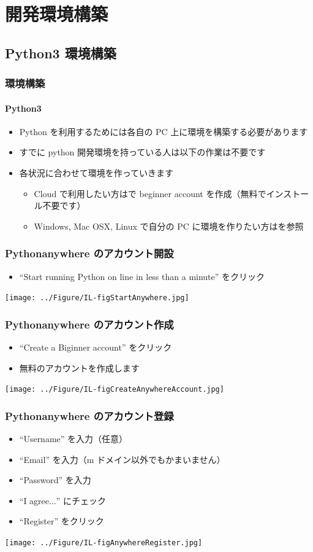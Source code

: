 \section{開発環境構築}
\subsection{Python3 環境構築}
\begin{frame}[shrink]
\frametitle{環境構築}
\framesubtitle{Python3}
  \begin{itemize}
\item Python を利用するためには各自の PC 上に環境を構築する必要があります
\item すでに python 開発環境を持っている人は以下の作業は不要です
\item 各状況に合わせて環境を作っていきます
    \begin{itemize}
\item Cloud で利用したい方は\href{https://www.pythonanywhere.com/}{}で beginner account を作成（無料でインストール不要です）
\item Windows, Mac OSX, Linux で自分の PC に環境を作りたい方は\href{https://www.python.jp/install/install.html}{}を参照
    \end{itemize}
  \end{itemize}
\end{frame}
\begin{frame}
\frametitle{Pythonanywhere のアカウント開設}
  \begin{itemize}
\item ``Start running Python on line in less than a minute'' をクリック
  \end{itemize}
\texttt{[image: ../Figure/IL-figStartAnywhere.jpg]}
\end{frame}
\begin{frame}
\frametitle{Pythonanywhere のアカウント作成}
  \begin{itemize}
\item ``Create a Biginner account'' をクリック
\item 無料のアカウントを作成します
  \end{itemize}
\texttt{[image: ../Figure/IL-figCreateAnywhereAccount.jpg]}
\end{frame}
\begin{frame}
\frametitle{Pythonanywhere のアカウント登録}
  \begin{itemize}
\item ``Username'' を入力（任意）
\item ``Email'' を入力（m ドメイン以外でもかまいません）
\item ``Password'' を入力
\item ``I agree$\ldots$'' にチェック
\item ``Register'' をクリック
  \end{itemize}
\texttt{[image: ../Figure/IL-figAnywhereRegister.jpg]}
\end{frame}
